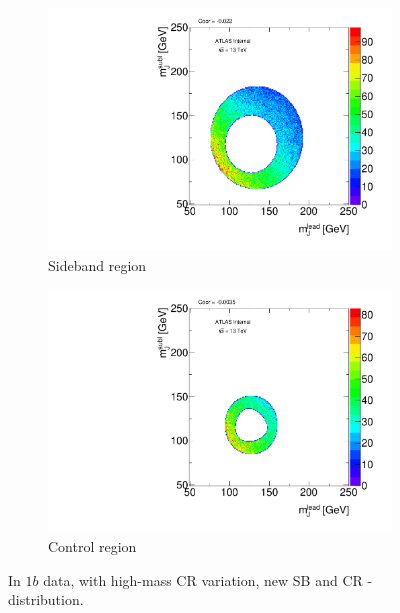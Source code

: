 \begin{figure}[htbp!]
\centering
\captionsetup{justification=centering}
    \begin{subfigure}[b]{0.45\textwidth}
        \includegraphics[width=\textwidth,angle=-90]{figures/boosted/Syst_CRSB/CR_High_Sideband_OneTag_mH0H1.pdf}
        \caption{Sideband region}
        \label{CRSB:CR_High_SB}
    \end{subfigure}
    \quad
    \begin{subfigure}[b]{0.45\textwidth}
        \includegraphics[width=\textwidth,angle=-90]{figures/boosted/Syst_CRSB/CR_High_Control_OneTag_mH0H1.pdf}
        \caption{Control region}
        \label{CRSB:CR_High_CR}
    \end{subfigure}
\caption{In $1b$ data, with high-mass CR variation, new SB and CR \mleadJ-\msublJ distribution.}
\label{CRSB:CR_High}
\end{figure}

